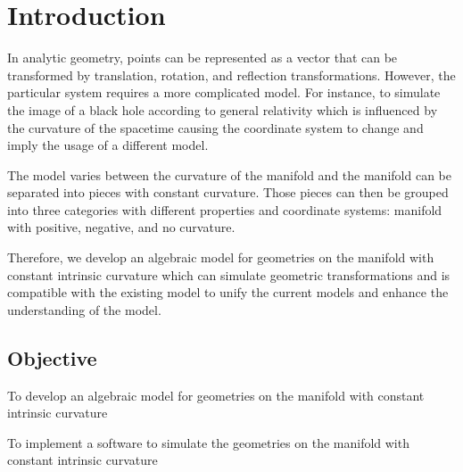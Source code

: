 \documentclass[../main.tex]{subfiles}
\begin{document}
\section{Introduction}
In analytic geometry, points can be represented as a vector
that can be transformed by translation, rotation, and reflection transformations.
However, the particular system requires a more complicated model.
For instance, to simulate the image of a black hole according to general relativity
which is influenced by the curvature of the spacetime
causing the coordinate system to change and imply the usage of a different model.

The model varies between the curvature of the manifold
and the manifold can be separated into pieces with constant curvature.
Those pieces can then be grouped into three categories
with different properties and coordinate systems:
manifold with positive, negative, and no curvature.

Therefore, we develop an algebraic model for geometries on the manifold with constant intrinsic curvature
which can simulate geometric transformations and is compatible with the existing model
to unify the current models and enhance the understanding of the model.

\subsection{Objective}
\begin{APAenumerate}
    \item To develop an algebraic model for geometries on the manifold with constant intrinsic curvature
    \item To implement a software to simulate the geometries on the manifold with constant intrinsic curvature
\end{APAenumerate}
\end{document}
